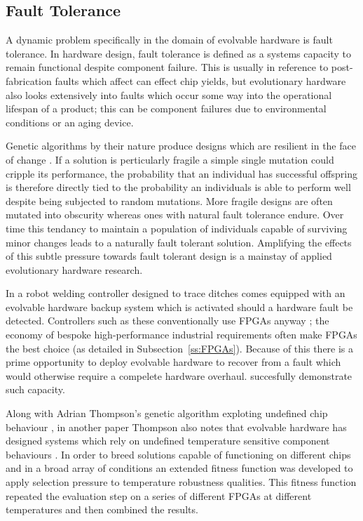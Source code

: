 \subsection{Fault Tolerance}

A dynamic problem specifically in the domain of evolvable hardware is fault
tolerance.
In hardware design, fault tolerance is defined as a systems capacity to
remain functional despite component failure. This is usually in reference to
post-fabrication faults which affect can effect chip yields, but evolutionary
hardware also looks extensively into faults which occur some way into the
operational lifespan of a product; this can be component failures due to environmental
conditions or an aging device.

Genetic algorithms by their nature produce designs which are resilient in the face
of change \cite{10.1007/3-540-46406-9_14}\cite{651463}. If a solution is perticularly fragile a
simple single mutation could cripple its performance, the probability that an individual
has successful offspring is therefore directly tied to the probability an individuals is
able to perform well
despite being subjected to random mutations. More fragile designs are often
mutated into obscurity whereas ones with
natural fault tolerance endure. Over time this tendancy to maintain a population
of individuals capable of surviving minor changes leads to a naturally fault tolerant
solution.
Amplifying the effects of this subtle pressure towards fault
tolerant design is a mainstay of applied evolutionary hardware research.

In \cite{10.1007/3-540-61093-6_6} a robot welding controller designed to trace
ditches comes equipped with an evolvable hardware backup system which is activated
should a hardware fault be detected. Controllers such as these conventionally use
FPGAs anyway \cite{4267891}; the economy of bespoke high-performance industrial requirements
often make FPGAs the best choice (as detailed in Subsection~\ref{ss:FPGAs}). Because of
this there is a prime opportunity to deploy evolvable hardware to recover from
a fault which would otherwise require a compelete hardware overhaul. \cite{10.1007/3-540-61093-6_6}
succesfully demonstrate such capacity.

Along with Adrian Thompson's genetic algorithm exploting undefined chip behaviour
\cite{10.1007/3-540-63173-9_61}, in another paper Thompson also notes that evolvable
hardware has designed
systems which rely on undefined temperature sensitive component behaviours
\cite{Thompson:1998:ADR:645508.656773}. In order to breed solutions capable
of functioning on different chips and in a broad array of conditions an extended
fitness function
was developed to apply selection pressure to temperature robustness qualities.
This fitness function repeated the evaluation step on a series of different FPGAs
at different temperatures and then combined the results.

